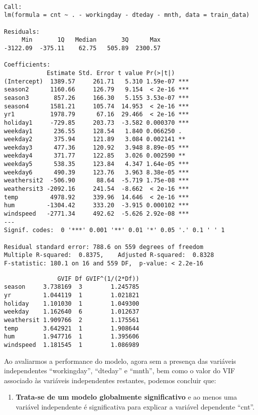 \documentclass[
  letterpaper,
  DIV=11,
  numbers=noendperiod]{scrartcl}
\providecommand{\tightlist}{%
  \setlength{\itemsep}{0pt}\setlength{\parskip}{0pt}}\usepackage{longtable,booktabs,array}
\begin{document}
\begin{verbatim}

Call:
lm(formula = cnt ~ . - workingday - dteday - mnth, data = train_data)

Residuals:
     Min       1Q   Median       3Q      Max 
-3122.09  -375.11    62.75   505.89  2300.57 

Coefficients:
            Estimate Std. Error t value Pr(>|t|)    
(Intercept)  1389.57     261.71   5.310 1.59e-07 ***
season2      1160.66     126.79   9.154  < 2e-16 ***
season3       857.26     166.30   5.155 3.53e-07 ***
season4      1581.21     105.74  14.953  < 2e-16 ***
yr1          1978.79      67.16  29.466  < 2e-16 ***
holiday1     -729.85     203.73  -3.582 0.000370 ***
weekday1      236.55     128.54   1.840 0.066250 .  
weekday2      375.94     121.89   3.084 0.002141 ** 
weekday3      477.36     120.92   3.948 8.89e-05 ***
weekday4      371.77     122.85   3.026 0.002590 ** 
weekday5      538.35     123.84   4.347 1.64e-05 ***
weekday6      490.39     123.76   3.963 8.38e-05 ***
weathersit2  -506.90      88.64  -5.719 1.75e-08 ***
weathersit3 -2092.16     241.54  -8.662  < 2e-16 ***
temp         4978.92     339.96  14.646  < 2e-16 ***
hum         -1304.42     333.20  -3.915 0.000102 ***
windspeed   -2771.34     492.62  -5.626 2.92e-08 ***
---
Signif. codes:  0 '***' 0.001 '**' 0.01 '*' 0.05 '.' 0.1 ' ' 1

Residual standard error: 788.6 on 559 degrees of freedom
Multiple R-squared:  0.8375,    Adjusted R-squared:  0.8328 
F-statistic: 180.1 on 16 and 559 DF,  p-value: < 2.2e-16
\end{verbatim}

\begin{verbatim}
               GVIF Df GVIF^(1/(2*Df))
season     3.738169  3        1.245785
yr         1.044119  1        1.021821
holiday    1.101030  1        1.049300
weekday    1.162640  6        1.012637
weathersit 1.909766  2        1.175561
temp       3.642921  1        1.908644
hum        1.947716  1        1.395606
windspeed  1.181545  1        1.086989
\end{verbatim}

Ao avaliarmos a performance do modelo, agora sem a presença das
variáveis independentes ``workingday'', ``dteday'' e ``mnth'', bem como
o valor do VIF associado às variáveis independentes restantes, podemos
concluir que:

\begin{enumerate}
\def\labelenumi{\arabic{enumi})}
\tightlist
\item
  \textbf{Trata-se de um modelo globalmente significativo} e ao menos
  uma variável independente é significativa para explicar a variável
  dependente ``cnt''.
\end{enumerate}
\end{document}
